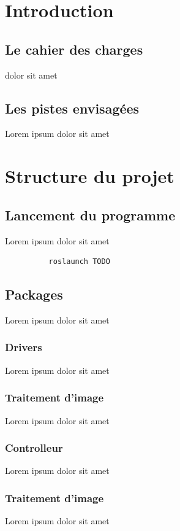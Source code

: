 \documentclass[12pt, openany]{report}
\begin{document}
\tableofcontents

\pagebreak

\section{Introduction}
\subsection{Le cahier des charges}
dolor sit amet
\subsection{Les pistes envisagées}
Lorem ipsum dolor sit amet

\section{Structure du projet}
\subsection{Lancement du programme}
Lorem ipsum dolor sit amet

\begin{lstlisting}
          roslaunch TODO
    \end{lstlisting}

\subsection{Packages}
Lorem ipsum dolor sit amet

\subsubsection{Drivers}
Lorem ipsum dolor sit amet

\subsubsection{Traitement d'image}
Lorem ipsum dolor sit amet

\subsubsection{Controlleur}
Lorem ipsum dolor sit amet

\subsubsection{Traitement d'image}
Lorem ipsum dolor sit amet
\end{document}
